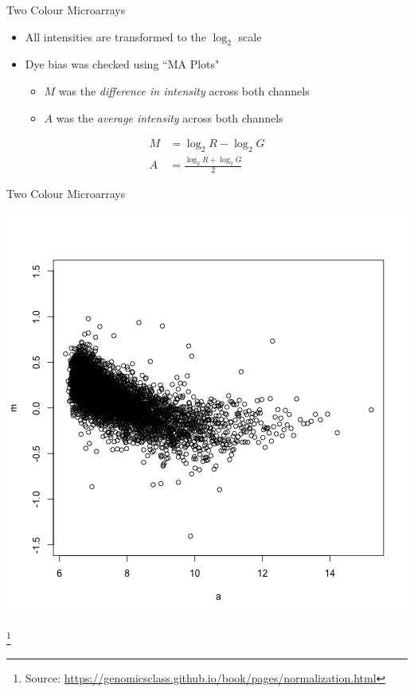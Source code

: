 \documentclass[aspectratio=169,11pt]{beamer}
\newcommand\blfootnote[1]{%
  \begingroup
  \renewcommand\thefootnote{}\footnote{#1}%
  \addtocounter{footnote}{-1}%
  \endgroup
}
\begin{document}
\begin{frame}{Two Colour Microarrays}

	\begin{itemize}
		\item All intensities are transformed to the $\log_2$ scale
		\item Dye bias was checked using ``MA Plots"
		\begin{itemize}
			\item $M$ was the \textit{difference in intensity} across both channels
			\item $A$ was the \textit{average intensity} across both channels
		\end{itemize}
	\end{itemize}
	\begin{align*}
		M &= \log_2 R - \log_2 G\\[3mm]
		A &= \frac{\log_2 R + \log_2 G}{2}
	\end{align*}

\end{frame}

\begin{frame}{Two Colour Microarrays}

	\begin{center}
		\includegraphics[scale=0.3]{figures/MA_plot.png} 
	\end{center}

\blfootnote{Source: \url{https://genomicsclass.github.io/book/pages/normalization.html}}	


\end{frame}
\end{document}
